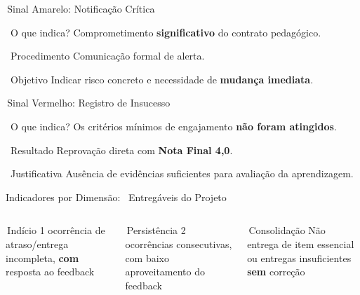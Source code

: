 \documentclass[xcolor=dvipsnames,table]{beamer}
\newcommand{\sazul}{\textcolor{NavyBlue}{\faCircle}\,}
\newcommand{\samarelo}{\textcolor{Goldenrod}{\faCircle}\,}
\newcommand{\svermelho}{\textcolor{BrickRed}{\faCircle}\,}
\begin{document}
  \begin{frame}{\samarelo Sinal Amarelo: Notificação Crítica}
    \begin{block}{\faExclamationTriangle\ O que indica?}
      Comprometimento \textbf{significativo} do contrato pedagógico.
    \end{block}
    \pause
    \begin{block}{\faFileAlt\ Procedimento}
      Comunicação formal de alerta.
    \end{block}
    \pause
    \begin{alertblock}{\faBullseye\ Objetivo}
      Indicar risco concreto e necessidade de \textbf{mudança imediata}.
    \end{alertblock}
  \end{frame}

  \begin{frame}{\svermelho Sinal Vermelho: Registro de Insucesso}
    \begin{alertblock}{\faBan\ O que indica?}
      Os critérios mínimos de engajamento \textbf{não foram atingidos}.
    \end{alertblock}
    \pause
    \begin{block}{\faTimesCircle\ Resultado}
      \centering Reprovação direta com \textbf{Nota Final 4,0}.
    \end{block}
    \pause
    \begin{exampleblock}{\faInfoCircle\ Justificativa}
      Ausência de evidências suficientes para avaliação da aprendizagem.
    \end{exampleblock}
  \end{frame}

  \begin{frame}[t]{Indicadores por Dimensão: \faFolder\ Entregáveis do Projeto}
    \begin{columns}
      \begin{block}{\centering \sazul Indício}
        \centering \scriptsize 1 ocorrência de atraso/entrega incompleta, \textbf{com} resposta
        ao feedback
      \end{block}
      \begin{alertblock}{\centering \samarelo Persistência}
        \centering \scriptsize 2 ocorrências consecutivas, com baixo aproveitamento do feedback
      \end{alertblock}
      \begin{block}{\centering \svermelho Consolidação}
        \centering \scriptsize Não entrega de item essencial ou entregas insuficientes
        \textbf{sem} correção
      \end{block}
    \end{columns}
  \end{frame}
\end{document}
